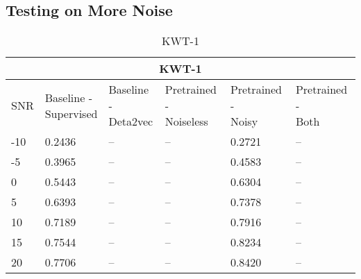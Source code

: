 \subsection{Testing on More Noise}\label{subsec:test2}

\begin{table}[ht]
    \centering
    \begin{tabular}{@{}llllll@{}}
        \multicolumn{6}{c}{\textbf{KWT-1}}\\
        \toprule
        SNR    & \makecell{ Baseline - \\ Supervised } & \makecell{ Baseline - \\ Deta2vec } & \makecell{ Pretrained - \\ Noiseless } & \makecell{ Pretrained - \\ Noisy } & \makecell{ Pretrained - \\ Both } \\ \midrule
        -10  & 0.2436 & -- & -- & 0.2721 & -- \\
        -5   & 0.3965 & -- & -- & 0.4583 & -- \\
        0    & 0.5443 & -- & -- & 0.6304 & -- \\
        5    & 0.6393 & -- & -- & 0.7378 & -- \\
        10   & 0.7189 & -- & -- & 0.7916 & -- \\
        15   & 0.7544 & -- & -- & 0.8234 & -- \\
        20   & 0.7706 & -- & -- & 0.8420 & -- \\
        
        \bottomrule
    \end{tabular}
    \caption{KWT-1}
    \label{tab:KWT-1_snrmix_busxbblxcafxssn}
\end{table}

